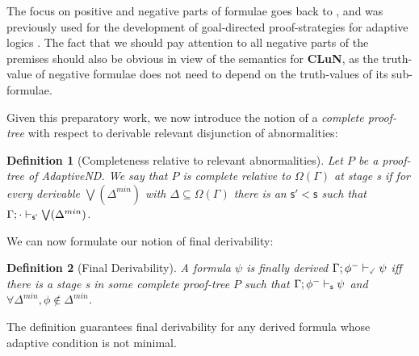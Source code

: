 \documentclass[]{article}
\newtheorem{definition}{Definition}
\newcommand{\Turn}[2]
    { {#1}\vdash_{\textbf{\sf s}}  {#2}}
\newcommand{\TurnPrime}[2]
    { {#1}\vdash_{\textbf{\sf s'}}  {#2}}
\newcommand{\TurnPrimePrime}[2]
    { {#1}\vdash_{\textbf{\sf s''}}  {#2}}
\newcommand{\TurnChecked}[2]
    { {#1}\vdash_{\textbf{\sf \checked}}  {#2}}
\begin{document}
The focus on positive and negative parts of formulae goes back to \cite{Sch60}, and was previously used for the development of goal-directed proof-strategies for adaptive logics \cite{Batens:LogiqueAnalyse:2001}. The fact that we should pay attention to all negative parts of the premises should also be obvious in view of the semantics for \textbf{CLuN}, as the truth-value of negative formulae does not need to depend on the truth-values of its sub-formulae.

Given this preparatory work, we now introduce the notion of a \textit{complete proof-tree} with respect to derivable relevant disjunction of abnormalities:

\begin{definition}[Completeness relative to relevant abnormalities]
Let $P$ be a proof-tree of {\sf AdaptiveND}. We say that $P$ is complete relative to $\Omega(\Gamma)$ at stage {\sf s} if for every derivable $\bigvee(\Delta^{min})$ with $\Delta\subseteq\Omega(\Gamma)$ there is an $\mathsf{s' < s}$ such that $\TurnPrime{\Gamma;\cdot}{\bigvee(\Delta^{min})}$.

%
\end{definition}



We can now formulate our notion of final derivability:

\begin{definition}[Final Derivability]\label{def:finalder}
A formula $\psi$ is finally derived $\TurnChecked{\Gamma;\phi^{-}}{\psi}$ iff there is a stage {\sf s}  in some complete proof-tree $P$
 such that $\Turn{\Gamma;\phi^{-}}{\psi}$ and $\forall \Delta^{min},\phi \notin \Delta^{min}$.
\end{definition}
%
The definition guarantees final derivability for any derived formula whose adaptive condition is not minimal.
\end{document}
